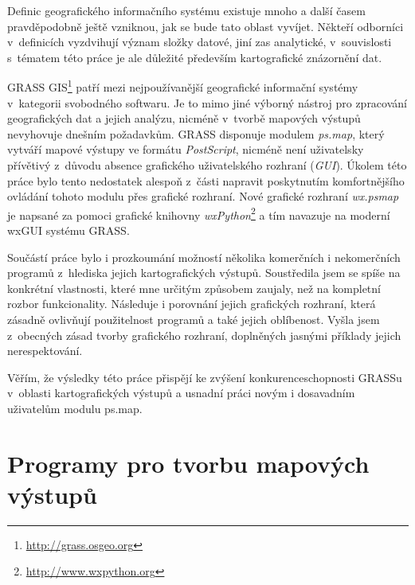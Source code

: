 \documentclass[a4paper,12pt,draft]{article}
\newcommand{\modul}[1]{\emph{#1}}
\begin{document}
Definic geografického informačního systému existuje mnoho
a další časem pravdě\-podobně ještě vzniknou, jak se bude tato oblast
vyvíjet. Někteří odborníci v~definicích vyzdvihují význam složky
datové, jiní zas analytické, v~souvislosti s~tématem této práce je
ale důležité především kartografické znázornění dat.


GRASS GIS\footnote{\url{http://grass.osgeo.org}} patří mezi nejpoužívanější
geografické informační
systémy v~kategorii svobodného softwaru. Je to mimo jiné výborný nástroj
pro zpracování geografických dat  a jejich analýzu, nicméně v~tvorbě mapových
výstupů nevyhovuje dnešním požadavkům. GRASS disponuje modulem \modul{ps.map},
který
vytváří mapové výstupy ve formátu \emph{PostScript}, nicméně není uživatelsky
přívětivý z~důvodu absence grafického uživatelského rozhraní (\emph{GUI}).
Úkolem této práce
bylo tento nedostatek alespoň z~části napravit  poskytnutím
komfortnějšího ovládání tohoto modulu přes grafické rozhraní.
Nové grafické rozhraní \emph{wx.psmap} je napsané za pomoci grafické knihovny
\emph{wxPython}\footnote{\url{http://www.wxpython.org}} a tím navazuje na
moderní wxGUI \cite{wxGUI_clanek} systému GRASS.


Součástí práce bylo i prozkoumání možností několika komerčních i nekomerčních
programů z~hlediska jejich kartografických výstupů. Soustředila jsem se spíše
na konkrétní vlastnosti, které mne určitým způsobem zaujaly, než na kompletní
rozbor funkcionality. Následuje i porovnání jejich grafických rozhraní, která
zásadně ovlivňují použitelnost programů a také jejich oblíbenost. Vyšla jsem
z~obecných zásad tvorby grafického rozhraní, doplněných jasnými příklady jejich
nerespektování.


Věřím, že výsledky této práce přispějí ke zvýšení konkurenceschopnosti GRASSu
 v~oblasti kartografických výstupů a usnadní práci novým i dosavadním
uživatelům modulu ps.map.


\newpage
\section{Programy pro tvorbu mapových výstupů}
\end{document}
